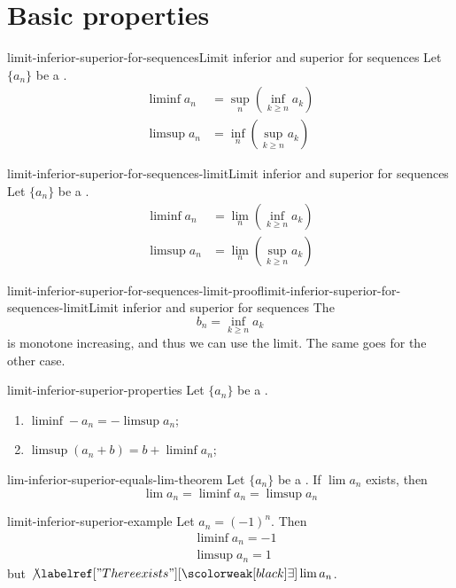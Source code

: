 \documentclass[preview]{standalone}
\begin{document}
\genpage

\section{Basic properties}

\begin{snippetproposition}{limit-inferior-superior-for-sequences}{Limit inferior and superior for sequences}
    Let \(\{a_n\}\) be a \sequence.
    \begin{align*}
        \liminf a_n &= \sup_n \left( \inf_{k\geq n} a_k \right) \\
        \limsup a_n &= \inf_n \left( \sup_{k\geq n} a_k \right)
    \end{align*}
\end{snippetproposition}


\begin{snippetproposition}{limit-inferior-superior-for-sequences-limit}{Limit inferior and superior for sequences}
    Let \(\{a_n\}\) be a \sequence.
    \begin{align*}
        \liminf a_n &= \lim_n \left( \inf_{k\geq n} a_k \right) \\
        \limsup a_n &= \lim_n \left( \sup_{k\geq n} a_k \right)
    \end{align*}
\end{snippetproposition}

\begin{snippetproof}{limit-inferior-superior-for-sequences-limit-proof}{limit-inferior-superior-for-sequences-limit}{Limit inferior and superior for sequences}
    The \sequence
    \[
        b_n = \inf_{k\geq n} a_k
    \]
    is monotone increasing, and thus we can use the limit. The same goes for the other case.
\end{snippetproof}

\begin{snippetproposition}{limit-inferior-superior-properties}{}
    Let \(\{a_n\}\) be a \sequence.
    \begin{enumerate}
        \item \(\liminf -a_n = -\limsup a_n\);
        \item \(\limsup(a_n + b) = b + \liminf a_n\);
    \end{enumerate}
\end{snippetproposition}

\begin{snippettheorem}{lim-inferior-superior-equals-lim-theorem}{}
    Let \(\{a_n\}\) be a \sequence. If \(\lim a_n\) exists, then
    \[
        \lim a_n = \liminf a_n = \limsup a_n
    \]
\end{snippettheorem}

\begin{snippetexample}{limit-inferior-superior-example}{}
    Let \(a_n = (-1)^n\). Then
    \begin{align*}
        &\liminf a_n = -1 \\
        &\limsup a_n = 1
    \end{align*}
    but \(\not\exists \lim a_n\).
\end{snippetexample}
\end{document}
